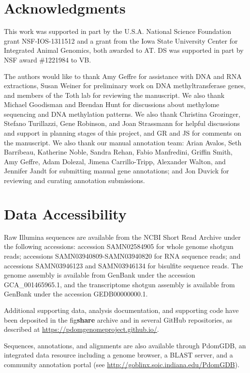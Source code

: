 \section{Acknowledgments}

This work was supported in part by the U.S.A. National Science
Foundation grant NSF-IOS-1311512 and a grant from the Iowa State
University Center for Integrated Animal Genomics, both awarded to AT. DS
was supported in part by NSF award \#1221984 to VB.

The authors would like to thank Amy Geffre for assistance with DNA and
RNA extractions, Susan Weiner for preliminary work on DNA
methyltransferase genes, and members of the Toth lab for reviewing the
manuscript. We also thank Michael Goodisman and Brendan Hunt for
discussions about methylome sequencing and DNA methylation patterns. We
also thank Christina Grozinger, Stefano Turillazzi, Gene Robinson, and
Joan Strassmann for helpful discussions and support in planning stages
of this project, and GR and JS for comments on the manuscript. We also
thank our manual annotation team: Arian Avalos, Seth Barribeau,
Katherine Noble, Sandra Rehan, Fabio Manfredini, Griffin Smith, Amy
Geffre, Adam Dolezal, Jimena Carrillo-Tripp, Alexander Walton, and
Jennifer Jandt for submitting manual gene annotations; and Jon Duvick
for reviewing and curating annotation submissions.

\section{Data Accessibility}

Raw Illumina sequences are available from the NCBI Short Read Archive
under the following accessions: accession SAMN02584905 for whole genome
shotgun reads; accessions SAMN03940809-SAMN03940820 for RNA sequence
reads; and accessions SAMN03946123 and SAMN03946134 for bisulfite
sequence reads. The genome assembly is available from GenBank under the
accession GCA\_001465965.1, and the transcriptome shotgun assembly is
available from GenBank under the accession GEDB00000000.1.

Additional supporting data, analysis documentation, and supporting code
have been deposited in the fig\textbf{share} archive and in several
GitHub repositories, as described at
\url{https://pdomgenomeproject.github.io/}.

Sequences, annotations, and alignments are also available through
PdomGDB, an integrated data resource including a genome browser, a BLAST
server, and a community annotation portal (see
\url{http://goblinx.soic.indiana.edu/PdomGDB}).

